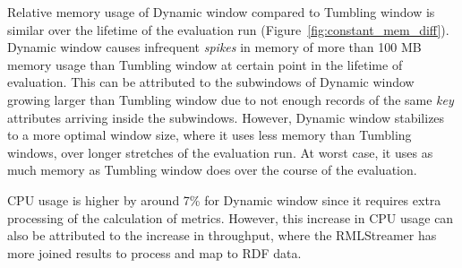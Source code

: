 Relative memory usage of Dynamic window compared to Tumbling window is similar over the lifetime of the 
evaluation run (Figure~\ref{fig:constant_mem_diff}). Dynamic window causes infrequent \emph{spikes} in memory of more 
than 100 MB memory usage than Tumbling window at certain point in the lifetime of evaluation. This can be attributed 
to the subwindows of Dynamic window growing larger than Tumbling window due to not enough records of the same 
\emph{key} attributes arriving inside the subwindows. However, Dynamic window stabilizes to a more optimal 
window size, where it uses less memory than Tumbling windows, over longer stretches of the evaluation run. At worst case, 
it uses as much memory as Tumbling window does over the course of the evaluation. 

CPU usage is higher by around 7\% for Dynamic window since it requires extra processing of the calculation of metrics. However, this 
increase in CPU usage can also be attributed to the increase in throughput, where the RMLStreamer has more joined results 
to process and map to RDF data.  

